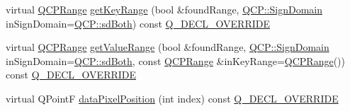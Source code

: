 \begin{DoxyCompactItemize}
virtual \hyperlink{class_q_c_p_range}{Q\+C\+P\+Range} \hyperlink{class_q_c_p_bars_ac5a3854774d9d9cd129b1eae1426de2d}{get\+Key\+Range} (bool \&found\+Range, \hyperlink{namespace_q_c_p_afd50e7cf431af385614987d8553ff8a9}{Q\+C\+P\+::\+Sign\+Domain} in\+Sign\+Domain=\hyperlink{namespace_q_c_p_afd50e7cf431af385614987d8553ff8a9aa38352ef02d51ddfa4399d9551566e24}{Q\+C\+P\+::sd\+Both}) const \hyperlink{qcustomplot_8hh_a42cc5eaeb25b85f8b52d2a4b94c56f55}{Q\+\_\+\+D\+E\+C\+L\+\_\+\+O\+V\+E\+R\+R\+I\+DE}
\item 
virtual \hyperlink{class_q_c_p_range}{Q\+C\+P\+Range} \hyperlink{class_q_c_p_bars_a02cee4bf94d48a1e5f6fc185d9a10477}{get\+Value\+Range} (bool \&found\+Range, \hyperlink{namespace_q_c_p_afd50e7cf431af385614987d8553ff8a9}{Q\+C\+P\+::\+Sign\+Domain} in\+Sign\+Domain=\hyperlink{namespace_q_c_p_afd50e7cf431af385614987d8553ff8a9aa38352ef02d51ddfa4399d9551566e24}{Q\+C\+P\+::sd\+Both}, const \hyperlink{class_q_c_p_range}{Q\+C\+P\+Range} \&in\+Key\+Range=\hyperlink{class_q_c_p_range}{Q\+C\+P\+Range}()) const \hyperlink{qcustomplot_8hh_a42cc5eaeb25b85f8b52d2a4b94c56f55}{Q\+\_\+\+D\+E\+C\+L\+\_\+\+O\+V\+E\+R\+R\+I\+DE}
\item 
virtual Q\+PointF \hyperlink{class_q_c_p_bars_a55cdaf565cd3384158d1f7f89533bc2d}{data\+Pixel\+Position} (int index) const \hyperlink{qcustomplot_8hh_a42cc5eaeb25b85f8b52d2a4b94c56f55}{Q\+\_\+\+D\+E\+C\+L\+\_\+\+O\+V\+E\+R\+R\+I\+DE}
\end{DoxyCompactItemize}

